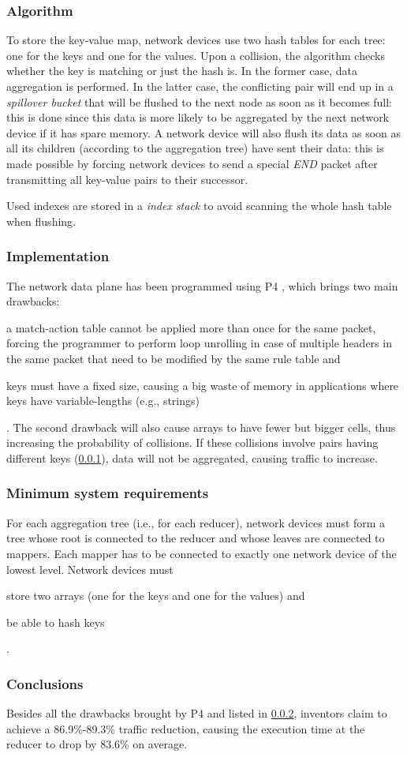 \subsubsection{Algorithm} \label{daiet_algorithm}
To store the key-value map, network devices use two hash tables for each tree: one for the keys and one for the values.
Upon a collision, the algorithm checks whether the key is matching or just the hash is.
In the former case, data aggregation is performed. In the latter case, the conflicting pair will end up in a \textit{spillover bucket} that will be flushed to the next node as soon as it becomes full: this is done since this data is more likely to be aggregated by the next network device if it has spare memory.
A network device will also flush its data as soon as all its children (according to the aggregation tree) have sent their data: this is made possible by forcing network devices to send a special \textit{END} packet after transmitting all key-value pairs to their successor.\par
Used indexes are stored in a \textit{index stack} to avoid scanning the whole hash table when flushing.

\subsubsection{Implementation} \label{daiet_implementation} \label{p4_drawbacks}
The network data plane has been programmed using P4 \cite{p4}, which brings two main drawbacks:
\begin{mylist}
    \item a match-action table cannot be applied more than once for the same packet, forcing the programmer to perform loop unrolling in case of multiple headers in the same packet that need to be modified by the same rule table and
    \item keys must have a fixed size, causing a big waste of memory in applications where keys have variable-lengths (e.g., strings)
\end{mylist}.
The second drawback will also cause arrays to have fewer but bigger cells, thus increasing the probability of collisions.
If these collisions involve pairs having different keys (\cref{daiet_algorithm}), data will not be aggregated, causing traffic to increase.

\subsubsection{Minimum system requirements}
For each aggregation tree (i.e., for each reducer), network devices must form a tree whose root is connected to the reducer and whose leaves are connected to mappers.
Each mapper has to be connected to exactly one network device of the lowest level.
Network devices must
\begin{mylist}
    \item store two arrays (one for the keys and one for the values) and
    \item be able to hash keys
\end{mylist}.

\subsubsection{Conclusions}
Besides all the drawbacks brought by P4 \cite{p4} and listed in \cref{daiet_implementation}, inventors claim to achieve a 86.9\%-89.3\% traffic reduction, causing the execution time at the reducer to drop by 83.6\% on average.